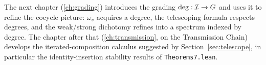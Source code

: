 The next chapter (\cref{ch:grading}) introduces the grading
$\deg : \mathcal{I} \to G$ and uses it to refine the cocycle picture: $\omega_v$
acquires a degree, the telescoping formula respects degrees, and the
weak/strong dichotomy refines into a spectrum indexed by degree. The
chapter after that (\cref{ch:transmission}, on the Transmission Chain)
develops the iterated-composition calculus suggested by
Section~\ref{sec:telescope}, in particular the identity-insertion stability
results of \texttt{Theorems7.lean}.

